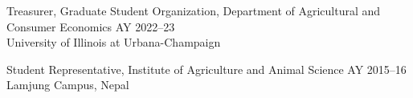     
Treasurer, Graduate Student Organization, Department of Agricultural and Consumer Economics \hfill AY 2022--23\\
University of Illinois at Urbana-Champaign
    
Student Representative, Institute of Agriculture and Animal Science \hfill AY 2015--16\\
Lamjung Campus, Nepal